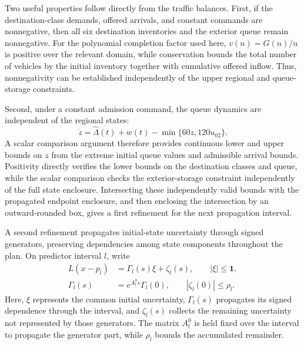 \documentclass[preprint,12pt]{elsarticle}
\begin{document}
Two useful properties follow directly from the traffic balances. First, if the
destination-class demands, offered arrivals, and constant commands are
nonnegative, then all six destination inventories and the exterior queue remain
nonnegative. For the polynomial completion factor used here,
$v(n)=G(n)/n$ is positive over the relevant domain, while conservation bounds
the total number of vehicles by the initial inventory together with cumulative
offered inflow. Thus, nonnegativity can be established independently of the
upper regional and queue-storage constraints.

Second, under a constant admission command, the queue dynamics are independent
of the regional states:
\begin{equation}
 \dot z=\widehat\Lambda(t)+w(t)-\min\{60z,120u_{02}\}.
 \label{eq:structure-scalar-queue}
\end{equation}
A scalar comparison argument therefore provides continuous lower and upper
bounds on $z$ from the extreme initial queue values and admissible arrival
bounds. Positivity directly verifies the lower bounds on the destination
classes and queue, while the scalar comparison checks the exterior-storage
constraint independently of the full state enclosure. Intersecting these
independently valid bounds with the propagated endpoint enclosure, and then
enclosing the intersection by an outward-rounded box, gives a first
refinement for the next propagation interval.

A second refinement propagates initial-state uncertainty through signed
generators, preserving dependencies among state components throughout the plan. On predictor interval $l$, write
\begin{equation}
 \begin{aligned}
 L(x-p_l)&=\Gamma_l(s)\xi+\zeta_l(s),\qquad |\xi|\le\mathbf1,\\
 \Gamma_l(s)&=e^{A_l^0s}\Gamma_l(0),\qquad |\zeta_l(0)|\le\rho_l.
 \end{aligned}
 \label{eq:structure-affine-set}
\end{equation}
Here, $\xi$ represents the common initial uncertainty, $\Gamma_l(s)$ propagates
its signed dependence through the interval, and $\zeta_l(s)$ collects the
remaining uncertainty not represented by those generators. The matrix
$A_l^0$ is held fixed over the interval to propagate the generator part, while
$\rho_l$ bounds the accumulated remainder.
\end{document}
